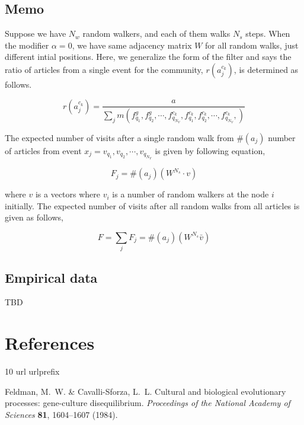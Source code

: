 \documentclass{nature}
\begin{document}
\begin{methods}
\subsection{Memo}

Suppose we have $N_w$ random walkers, and each of them walks $N_s$ steps. When the modifier $\alpha = 0$, we have same adjacency matrix $W$ for all random walks, just different intial positions. Here, we generalize the form of the filter and says the ratio of articles from a single event for the community, $r(a_j^{c_k})$, is determined as follows.

\begin{equation}
  r(a_j^{c_k}) = \frac{a}{\sum_j m(f_{q_1}^g, f_{q_2}^g, \cdots, f_{q_{N_V}}^{c_k}, f_{q_1}^{c_k}, f_{q_2}^{c_k}, \cdots, f_{q_{N_V}}^{c_k}, )}
\end{equation}



The expected number of visits after a single random walk from $\#(a_j)$ number of articles from event $x_j = {v_{q_1}, v_{q_2}, \cdots, v_{q_{N_V}}}$ is given by following equation,

\begin{equation}
  F_j = \#(a_j) (W^{N_s} \cdot v)
\end{equation}

where $v$ is a vectors where $v_i$ is a number of random walkers at the node $i$ initially. The expected number of visits after all random walks from all articles is given as follows,

\begin{equation}
  F = \sum_j {F_j} = \#(a_j) (W^{N_s}\bar{v})
\end{equation}

\subsection{Empirical data}
TBD


\end{methods}



\section{References}

\begin{thebibliography}{10}
  \expandafter\ifx\csname url\endcsname\relax
    \def\url#1{\texttt{#1}}\fi
  \expandafter\ifx\csname urlprefix\endcsname\relax\def\urlprefix{URL }\fi
  \providecommand{\bibinfo}[2]{#2}
  \providecommand{\eprint}[2][]{\url{#2}}
  
  \bibinfo{author}{Feldman, M.~W.} \& \bibinfo{author}{Cavalli-Sforza, L.~L.}
  \newblock \bibinfo{title}{Cultural and biological evolutionary processes:
    gene-culture disequilibrium}.
  \newblock \emph{\bibinfo{journal}{Proceedings of the National Academy of
    Sciences}} \textbf{\bibinfo{volume}{81}}, \bibinfo{pages}{1604--1607}
    (\bibinfo{year}{1984}).
  
  \end{thebibliography}
  
\end{document}
